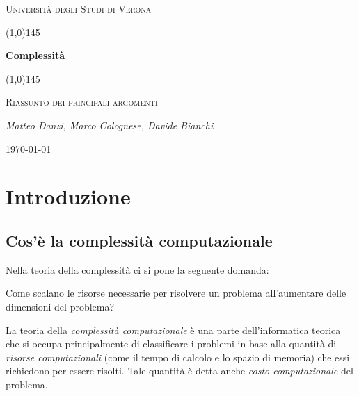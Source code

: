 \documentclass[a4paper]{article}
\theoremstyle{definition}
\begin{document}
 \clearpage
 \begin{titlepage}
 	\centering
 	\vspace*{\fill}
 	{\scshape\LARGE Università degli Studi di Verona \par}
 	\vspace{1.5cm}
 	\line(1,0){145} \\
 	{\huge\bfseries Complessità\par}
 	\line(1,0){145} \\
 	\vspace{0.5cm}
 	{\scshape\Large Riassunto dei principali argomenti\par}
 	\vspace{2cm}
 	{\Large\itshape Matteo Danzi, Marco Colognese, Davide Bianchi\par}
 	\vspace{1cm}
 	
 	\vspace{5cm}
 	\vspace*{\fill}
 	{\large \today\par}
 \end{titlepage}
  \thispagestyle{empty}
  \newpage
	
	\tableofcontents
	\listoffigures
	\lstlistoflistings
	
	\newpage

	\section{Introduzione}
	
	\subsection{Cos'è la complessità computazionale}
		Nella teoria della complessità ci si pone la seguente domanda:
		
		\begin{displayquote}
		Come scalano le risorse necessarie per risolvere un problema all'aumentare delle dimensioni del problema?
		\end{displayquote} 

		La teoria della \textit{complessità computazionale} è una parte dell’informatica teorica che si
		occupa principalmente di classificare i problemi in base alla quantità di \textit{risorse computazionali} (come il tempo di calcolo e lo spazio di memoria) che essi richiedono per
		essere risolti. Tale quantità è detta anche \textit{costo computazionale} del problema.
		
\end{document}
